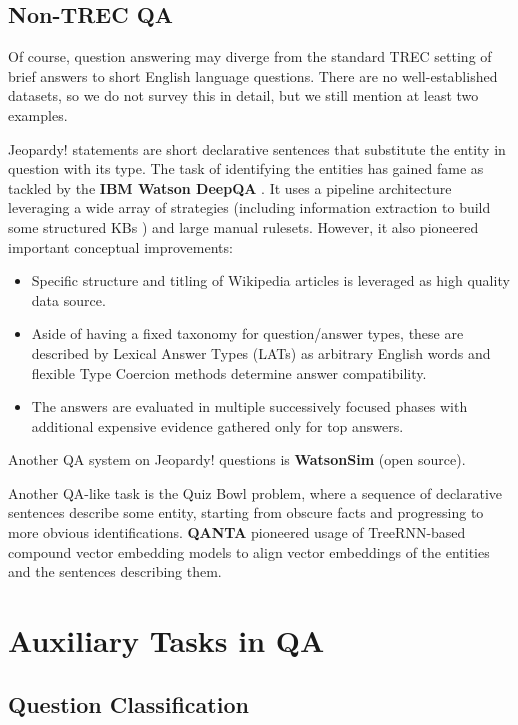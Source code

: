 \subsection{Non-TREC QA}

Of course, question answering may diverge from the standard TREC
setting of brief answers to short English language questions.
There are no well-established datasets, so we do not survey this
in detail, but we still mention at least two examples.

Jeopardy! statements are short declarative sentences that substitute
the entity in question with its type.
The task of identifying the entities has gained fame as tackled
by the \textbf{IBM Watson DeepQA} \citep{WatsonOverview, WatsonIntro}.
It uses a pipeline architecture leveraging a wide array of strategies
(including information extraction to build some structured KBs \citep{WatsonRelEx})
and large manual rulesets.
However, it also pioneered important conceptual improvements:
\begin{itemize}
	\item Specific structure and titling of Wikipedia articles is leveraged as high quality data source. \citep{WatsonIR}
	\item Aside of having a fixed taxonomy for question/answer types, these are described by Lexical Answer Types (LATs) as arbitrary English words and flexible Type Coercion methods determine answer compatibility. \citep{WatsonTyCor}
	\item The answers are evaluated in multiple successively focused phases with additional expensive evidence gathered only for top answers. \citep{WatsonScoring}
\end{itemize}
Another QA system on Jeopardy! questions is \textbf{WatsonSim} \citep{WatsonSim}
(open source).

Another QA-like task is the Quiz Bowl problem, where a sequence
of declarative sentences describe some entity, starting from
obscure facts and progressing to more obvious identifications.
\textbf{QANTA} \citep{QANTA} pioneered usage of TreeRNN-based compound
vector embedding models to align vector embeddings of the entities
and the sentences describing them.




\section{Auxiliary Tasks in QA}

\subsection{Question Classification}

